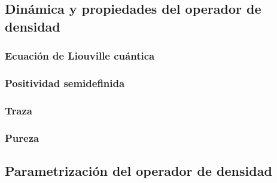 \subsection{Dinámica y propiedades del operador de densidad}
\subsubsection{Ecuación de Liouville cuántica}
\subsubsection{Positividad semidefinida}
\subsubsection{Traza}
\subsubsection{Pureza}
\subsection{Parametrización del operador de densidad}

